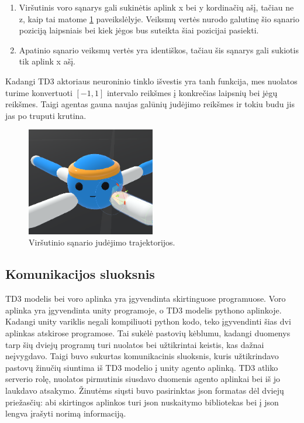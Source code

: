 \documentclass[a4paper, 12pt]{article}
\begin{document}
\begin{enumerate}
  \addtolength{\itemsep}{-0.5\baselineskip} 
  \item Viršutinis voro sąnarys gali sukinėtis aplink x bei y kordinačių ašį, tačiau ne z, kaip tai matome \ref{SanarioJudejimoTrajektorijos} paveikslėlyje. Veiksmų vertės nurodo galutinę šio sąnario poziciją laipsniais bei kiek jėgos bus suteikta šiai pozicijai pasiekti.
  \item Apatinio sąnario veiksmų vertės yra identiškos, tačiau šis sąnarys gali sukiotis tik aplink x ašį.
\end{enumerate}

Kadangi TD3 aktoriaus neuroninio tinklo išvestis yra tanh funkcija, mes nuolatos turime konvertuoti $[-1,1]$ intervalo reikšmes į konkrečias laipsnių bei jėgų reikšmes. Taigi agentas gauna naujas galūnių judėjimo reikšmes ir tokiu budu jis jas po truputi krutina.

\begin{figure}[h]
\centering
\includegraphics[width=0.5\textwidth]{SanarioJudejimoTrajektorijos}
\caption{Viršutinio sąnario judėjimo trajektorijos.}
\label{SanarioJudejimoTrajektorijos}
\end{figure}


\subsection{Komunikacijos sluoksnis}

TD3 modelis bei voro aplinka yra įgyvendinta skirtinguose programuose. Voro aplinka yra įgyvendinta unity programoje, o TD3 modelis pythono aplinkoje. Kadangi unity variklis negali kompiliuoti python kodo, teko įgyvendinti šias dvi aplinkas atskirose programose. Tai sukėlė pastovių kėblumu, kadangi duomenys tarp šių dviejų programų turi nuolatos bei užtikrintai keistis, kas dažnai neįvygdavo. Taigi buvo sukurtas komunikacinis sluoksnis, kuris užtikrindavo pastovų žinučių siuntima iš TD3 modelio į unity agento aplinką. TD3 atliko serverio rolę, nuolatos pirmutinis siusdavo duomenis agento aplinkai bei iš jo laukdavo atsakymo. Žinutėms siųsti buvo pasirinktas json formatas dėl dviejų priežasčių: abi skirtingos aplinkos turi json nuskaitymo bibliotekas bei į json lengva įrašyti norimą informaciją. 
\end{document}
